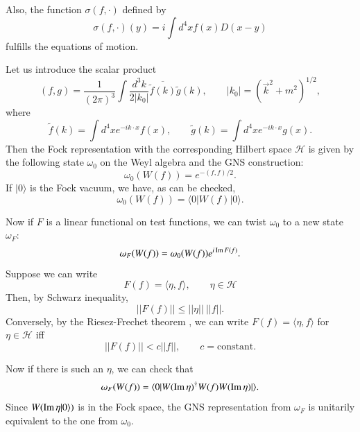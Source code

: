 Also, the function $\sigma (f,\cdot)$ defined by
\begin{equation}
\sigma(f,\cdot)(y)=i\int d^{4}xf(x)D(x-y)\label{chap1-eq2.16}
\end{equation}
fulfills the equations of motion.

Let us introduce the scalar product
$$
(f,g)=\frac{1}{(2\pi)^{3}}\int \dfrac{d^{3}k}{2|k_{0}|}\overline{\widetilde{f}(k)}\widetilde{g}(k),\qquad |k_{0}|=(\overrightarrow{k}^{2}+m^{2})^{1/2},
$$
where
\begin{equation}
\widetilde{f}(k)=\int d^{4}xe^{-ik\cdot x}f(x),\qquad \widetilde{g}(k)=\int d^{4}xe^{-ik\cdot x}g(x).\label{chap1-eq2.17}
\end{equation}
Then the Fock representation with the corresponding Hilbert space $\mathcal{H}$ is given by the following state $\omega_{0}$ on the Weyl algebra and the GNS construction:
\begin{equation}
\omega_{0}(W(f))=e^{-(f,f)/2}.\label{chap1-eq2.18}
\end{equation}
If $|0\rangle$ is the Fock vacuum, we have, as can be checked,
\begin{equation}
\omega_{0}(W(f))=\langle 0|W (f)|0\rangle.\label{chap1-eq2.19}
\end{equation}

Now if $F$ is a linear functional on test functions, we can twist $\omega_{0}$ to a new state $\omega_{F}$:
\begin{equation}
\omega_{F}(W(f))=\omega_{0}(W(f))e^{i \operatorname{\mathrm{Im}} F(f)}.\label{chap1-eq2.20} 
\end{equation}
Suppose we can write
\begin{equation}
F(f) = \langle\eta, f\rangle, \qquad \eta \in \mathcal{H} \label{chap1-eq2.21}
\end{equation}
Then, by Schwarz inequality,
\begin{equation}
|| F(f) || \leq ||\eta || ~ || f ||.\label{chap1-eq2.22}
\end{equation}
Conversely, by the Riesez-Frechet theorem \cite{key9}, we can write $F(f)= \langle \eta, f\rangle$ for $\eta \in \mathcal{H}$ iff
\begin{equation}
|| F(f) || < c || f||, \qquad c= \text{constant}. \label{chap1-eq2.23}
\end{equation}

Now if there is such an $\eta$, we can check that
\begin{equation}
\omega_F (W (f))= \langle 0| W (\operatorname{\mathrm{Im}} \eta)^\dagger W (f)W (\operatorname{\mathrm{Im}} \eta)|\rangle. \label{chap1-eq2-24}
\end{equation}
Since $W(\operatorname{\mathrm{Im}} \eta | 0 \rangle)$ is in the Fock space, the GNS representation from $\omega_F$ is unitarily equivalent to the one from $\omega_0$.

